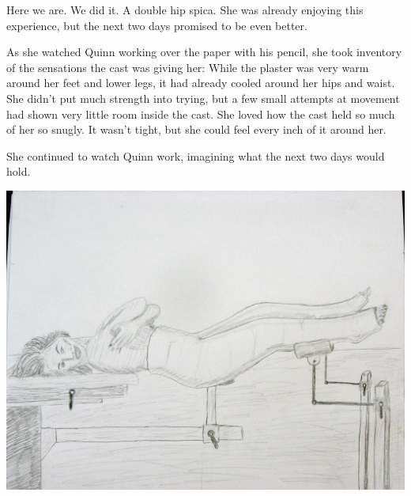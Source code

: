 \begin{thought}
Here we are. We did it. A double hip spica. She was already enjoying this experience, but
the next two days promised to be even better.

As she watched Quinn working over the paper with his pencil, she took inventory of the
sensations the cast was giving her: While the plaster was very warm around her feet and lower
legs, it had already cooled around her hips and waist. She didn't put much strength into trying,
but a few small attempts at movement had shown very little room inside the cast. She loved how
the cast held so much of her so snugly. It wasn't tight, but she could feel every inch of it
around her.

She continued to watch Quinn work, imagining what the next two days would hold.
\end{thought}

\begin{center}
\includegraphics[width=\textwidth]{images/kicks40.jpg}
\end{center}
